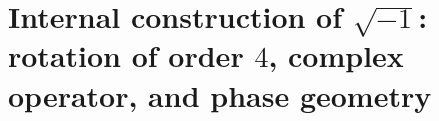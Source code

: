 \chapter{Internal construction of \(\sqrt{-1}\): rotation of order \(4\), complex operator, and phase geometry}
\label{chap:p3-final:32:raiz_menos_uno}

